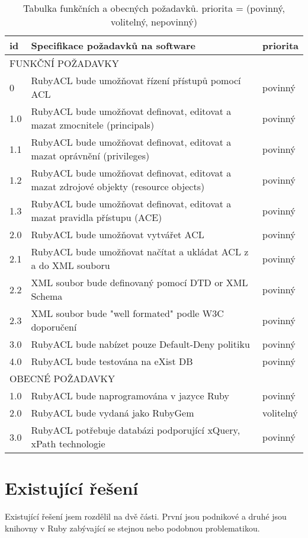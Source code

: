 \begin{table}%
\begin{center}
\begin{tabular}{|l|p{9cm}|l|}
\hline
\textbf{id} & \textbf{Specifikace požadavků na software} & \textbf{priorita} \\
\hline
\multicolumn{3}{|l|}{FUNKČNÍ POŽADAVKY} \\
\hline
0 & RubyACL	 bude umožňovat řízení přístupů pomocí ACL & povinný\\
\hline
1.0 & RubyACL bude umožňovat definovat, editovat a mazat zmocnitele (principals) & povinný\\
\hline
1.1 & RubyACL bude umožňovat definovat, editovat a mazat oprávnění (privileges) & povinný\\
\hline
1.2 & RubyACL bude umožňovat definovat, editovat a mazat  zdrojové objekty (resource objects) & povinný\\
\hline
1.3 & RubyACL bude umožňovat definovat, editovat a mazat pravidla přístupu (ACE) & povinný\\
\hline
2.0 & RubyACL bude umožňovat vytvářet ACL & povinný\\
\hline
2.1 & RubyACL bude umožňovat načítat a ukládat ACL z a do XML souboru & povinný\\
\hline
2.2 & XML soubor bude definovaný pomocí DTD or XML Schema & povinný\\
\hline
2.3 & XML soubor bude "well formated" podle W3C doporučení & povinný\\
\hline
3.0 & RubyACL bude nabízet pouze Default-Deny politiku & povinný\\
\hline
4.0 & RubyACL bude testována na eXist DB & povinný\\
\hline
\multicolumn{3}{|l|}{OBECNÉ POŽADAVKY} \\
\hline
1.0 & RubyACL bude naprogramována v jazyce Ruby & povinný \\
\hline
2.0 & RubyACL bude vydaná jako RubyGem & volitelný\\
\hline
3.0 & RubyACL potřebuje databázi podporující xQuery, xPath technologie & povinný\\
\hline
\end{tabular}
\end{center}
\caption{Tabulka funkčních a obecných požadavků. priorita = (povinný, volitelný, nepovinný)}
\label{tab:tab1}
\end{table}

\section{Existující řešení}
Existující řešení jsem rozdělil na dvě části. První jsou podnikové a druhé jsou knihovny v Ruby zabývající se stejnou nebo podobnou problematikou.

